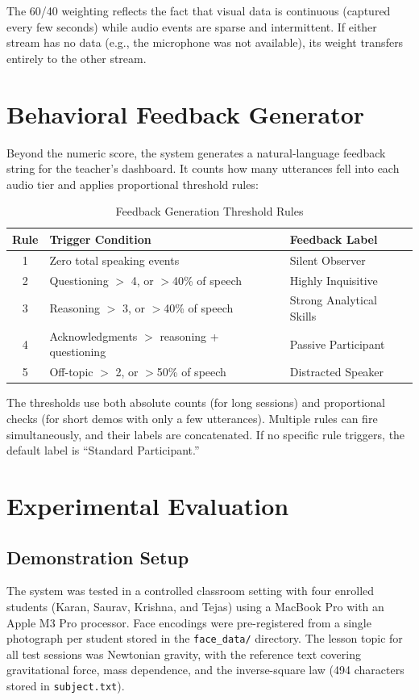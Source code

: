 \documentclass[conference]{IEEEtran}
\begin{document}
The 60/40 weighting reflects the fact that visual data is continuous (captured every few seconds) while audio events are sparse and intermittent. If either stream has no data (e.g., the microphone was not available), its weight transfers entirely to the other stream.

\section{Behavioral Feedback Generator}

Beyond the numeric score, the system generates a natural-language feedback string for the teacher's dashboard. It counts how many utterances fell into each audio tier and applies proportional threshold rules:

\begin{table}[htbp]
\caption{Feedback Generation Threshold Rules}
\begin{center}
\begin{tabular}{|c|p{3.6cm}|p{2.8cm}|}
\hline
\textbf{Rule} & \textbf{Trigger Condition} & \textbf{Feedback Label} \\
\hline
1 & Zero total speaking events & Silent Observer \\
\hline
2 & Questioning $>$ 4, or $>$40\% of speech & Highly Inquisitive \\
\hline
3 & Reasoning $>$ 3, or $>$40\% of speech & Strong Analytical Skills \\
\hline
4 & Acknowledgments $>$ reasoning + questioning & Passive Participant \\
\hline
5 & Off-topic $>$ 2, or $>$50\% of speech & Distracted Speaker \\
\hline
\end{tabular}
\label{tab:feedback}
\end{center}
\end{table}

The thresholds use both absolute counts (for long sessions) and proportional checks (for short demos with only a few utterances). Multiple rules can fire simultaneously, and their labels are concatenated. If no specific rule triggers, the default label is ``Standard Participant.''

\section{Experimental Evaluation}

\subsection{Demonstration Setup}
The system was tested in a controlled classroom setting with four enrolled students (Karan, Saurav, Krishna, and Tejas) using a MacBook Pro with an Apple M3 Pro processor. Face encodings were pre-registered from a single photograph per student stored in the \texttt{face\_data/} directory. The lesson topic for all test sessions was Newtonian gravity, with the reference text covering gravitational force, mass dependence, and the inverse-square law (494 characters stored in \texttt{subject.txt}).
\end{document}
